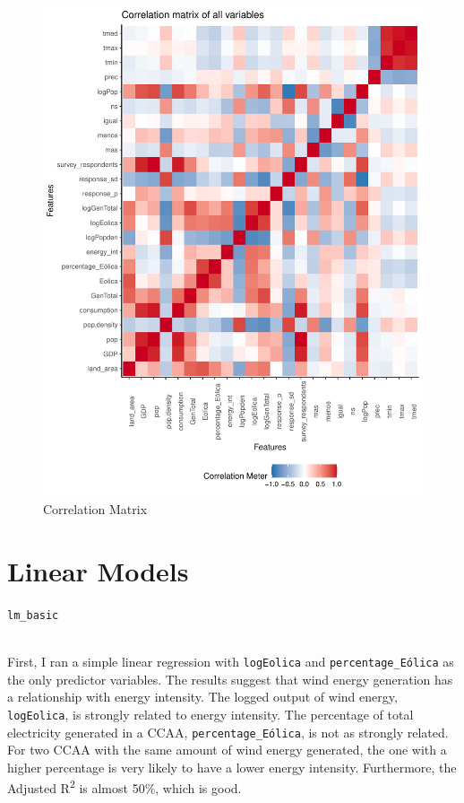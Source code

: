 \documentclass[
]{report}
\begin{document}
\begin{figure}

{\centering \includegraphics{Modelling_Energy_Intensity-V3_files/figure-pdf/cor-plot-1.pdf}

}

\caption{Correlation Matrix}

\end{figure}

\hypertarget{linear-models}{%
\section{Linear Models}\label{linear-models}}

\texttt{lm\_basic}\strut \\
First, I ran a simple linear regression with \texttt{logEolica} and
\texttt{percentage\_Eólica} as the only predictor variables. The results
suggest that wind energy generation has a relationship with energy
intensity. The logged output of wind energy, \texttt{logEolica}, is
strongly related to energy intensity. The percentage of total
electricity generated in a CCAA, \texttt{percentage\_Eólica}, is not as
strongly related. For two CCAA with the same amount of wind energy
generated, the one with a higher percentage is very likely to have a
lower energy intensity. Furthermore, the Adjusted R\textsuperscript{2}
is almost 50\%, which is good.
\end{document}
